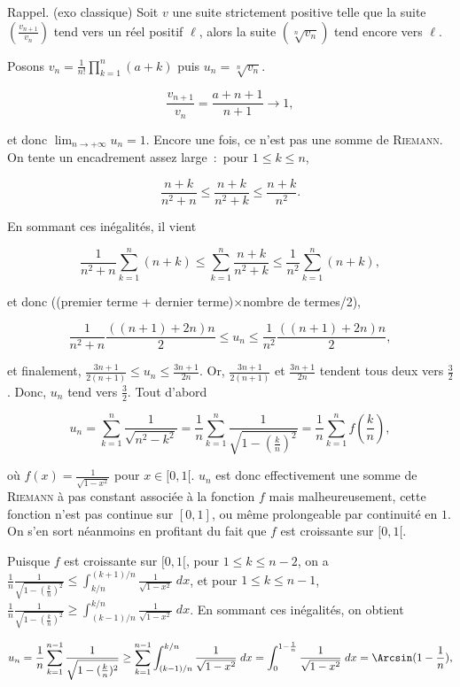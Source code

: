 {{Rappel. (exo classique) Soit $v$ une suite strictement positive telle que la suite $(\frac{v_{n+1}}{v_n})$ tend vers un réel positif $\ell$, alors la suite $(\sqrt[n]{v_n})$ tend encore vers $\ell$.

Posons $v_n=\frac{1}{n!}\prod_{k=1}^{n}(a+k)$ puis $u_n=\sqrt[n]{v_n}$.

$$\frac{v_{n+1}}{v_n}=\frac{a+n+1}{n+1}\rightarrow1,$$

et donc $\lim_{n\rightarrow +\infty}u_n=1$.
Encore une fois, ce n'est pas une somme de \textsc{Riemann}. On tente un encadrement assez large~:~pour $1\leq k\leq n$, 

$$\frac{n+k}{n^2+n}\leq\frac{n+k}{n^2+k}\leq\frac{n+k}{n^2}.$$

En sommant ces inégalités, il vient 

$$\frac{1}{n^2+n}\sum_{k=1}^{n}(n+k)\leq\sum_{k=1}^{n}\frac{n+k}{n^2+k}\leq\frac{1}{n^2}\sum_{k=1}^{n}(n+k),$$

et donc ((premier terme + dernier terme)$\times$nombre de termes/2),

$$\frac{1}{n^2+n}\frac{((n+1)+2n)n}{2}\leq u_n\leq\frac{1}{n^2}\frac{((n+1)+2n)n}{2},$$

et finalement, $\frac{3n+1}{2(n+1)}\leq u_n\leq\frac{3n+1}{2n}$. Or, $\frac{3n+1}{2(n+1)}$ et $\frac{3n+1}{2n}$ tendent tous deux vers $\frac{3}{2}$. Donc, $u_n$ tend vers $\frac{3}{2}$.
Tout d'abord

$$u_n=\sum_{k=1}^{n}\frac{1}{\sqrt{n^2-k^2}}=\frac{1}{n}\sum_{k=1}^{n}\frac{1}{\sqrt{1-(\frac{k}{n})^2}}=
\frac{1}{n}\sum_{k=1}^{n}f(\frac{k}{n}),$$ 

où $f(x)=\frac{1}{\sqrt{1-x^2}}$ pour $x\in[0,1[$. $u_n$ est donc effectivement une somme de \textsc{Riemann} à pas constant associée à la fonction $f$ mais malheureusement, cette fonction n'est pas continue sur $[0,1]$, ou même prolongeable par continuité en $1$. On s'en sort néanmoins en profitant du fait que $f$ est croissante sur $[0,1[$.

Puisque $f$ est croissante sur $[0,1[$, pour $1\leq k\leq n-2$, on a $\frac{1}{n}\frac{1}{\sqrt{1-(\frac{k}{n})^2}}\leq\int_{k/n}^{(k+1)/n}\frac{1}{\sqrt{1-x^2}}\;dx$, et pour $1\leq k\leq n-1$, $\frac{1}{n}\frac{1}{\sqrt{1-(\frac{k}{n})^2}}\geq\int_{(k-1)/n}^{k/n}\frac{1}{\sqrt{1-x^2}}\;dx$. En sommant ces inégalités, on obtient

$$u_n=\frac{1}{n}\sum_{k=1}^{n-1}\frac{1}{\sqrt{1-(\frac{k}{n})^2}}\geq\sum_{k=1}^{n-1}\int_{(k-1)/n}^{k/n}\frac{1}{\sqrt{1-x^2}}\;dx=\int_{0}^{1-\frac{1}{n}}\frac{1}{\sqrt{1-x^2}}\;dx=\Arcsin(1-\frac{1}{n}),$$

}}
